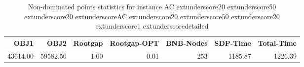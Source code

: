 \begin{table}
\caption{Non-dominated points statistics for instance AC	extunderscore20	extunderscore50	extunderscore20	extunderscoreAC	extunderscore20	extunderscore50	extunderscore20	extunderscore1	extunderscoredetailed}
\label{tab:stats/AC_20_50_20_AC_20_50_20_1_detailed}
\begin{tabular}{rrrrrrr}
\toprule
OBJ1 & OBJ2 & Rootgap & Rootgap-OPT & BNB-Nodes & SDP-Time & Total-Time \\
\midrule
43614.00 & 59582.50 & 1.00 & 0.01 & 253 & 1185.87 & 1226.39 \\
\bottomrule
\end{tabular}
\end{table}
